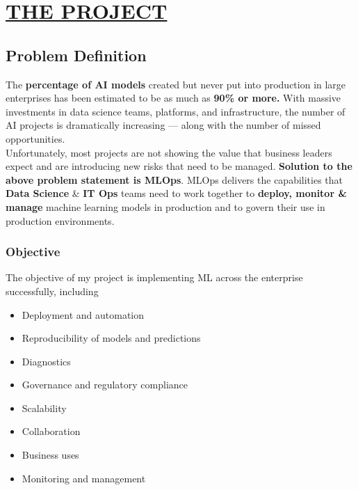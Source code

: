 \documentclass[12pt,oneside,a4paper]{report}
\begin{document}
\chapter{\underline{THE PROJECT}}
\section{Problem Definition}
\fontsize{12pt}{10pt}\selectfont
\vspace{5.0mm}
The \textbf{percentage of AI models} created but never put into production in large enterprises has been estimated to be as much as \textbf{90\% or more.} With massive investments in data science teams, platforms, and infrastructure, the number of AI projects is dramatically increasing — along with the number of missed opportunities.\\Unfortunately, most projects are not showing the value that business leaders expect and are introducing new risks that need to be managed.
\vspace{5.0mm}
\textbf{Solution to the above problem statement is MLOps}. MLOps delivers the capabilities that \textbf{Data Science} \& \textbf{IT Ops} teams need to work together to \textbf{deploy, monitor \& manage} machine learning models in production and to govern their use in production environments.
\subsection{Objective}
\fontsize{12pt}{10pt}\selectfont
The objective of my project is implementing ML across the enterprise successfully, including
\begin{itemize}
\item    Deployment and automation
\item    Reproducibility of models and predictions
\item    Diagnostics
\item    Governance and regulatory compliance
\item    Scalability
\item    Collaboration
\item    Business uses
\item    Monitoring and management
\end{itemize}
\end{document}
